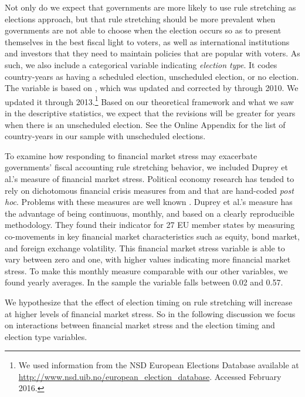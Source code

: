 \documentclass[]{article}
\begin{document}
Not only do we expect that governments are more likely to use rule stretching as elections approach, but that rule stretching should be more prevalent when governments are not able to choose when the election occurs so as to present themselves in the best fiscal light to voters, as well as international institutions and investors that they need to maintain policies that are popular with voters. As such, we also include a categorical variable indicating \emph{election type}. It codes country-years as having a scheduled election, unscheduled election, or no election. The variable is based on \cite{Brender2008}, which was updated and corrected by \cite{hallerbergWehner2015} through 2010. We updated it through 2013.\footnote{We used information from the NSD European Elections Database available at \url{http://www.nsd.uib.no/european_election_database}. Accessed February 2016.} Based on our theoretical framework and what we saw in the descriptive statistics, we expect that the revisions will be greater for years when there is an unscheduled election. See the Online Appendix for the list of country-years in our sample with unscheduled elections.

To examine how responding to financial market stress may exacerbate governments' fiscal accounting rule stretching behavior, we included Duprey et al.'s \citeyearpar{ThibautDuprey2015} measure of financial market stress. Political economy research has tended to rely on dichotomous financial crisis measures from \cite{Laeven2012} and \cite{ReinhartRog2010} that are hand-coded \emph{post hoc}. Problems with these measures are well known \citep[see][]{finstress_paper}. Duprey et al.'s measure has the advantage of being continuous, monthly, and based on a clearly reproducible methodology. They found their indicator for 27 EU member states by measuring co-movements in key financial market characteristics such as equity, bond market, and foreign exchange volatility. This financial market stress variable is able to vary between zero and one, with higher values indicating more financial market stress. To make this monthly measure comparable with our other variables, we found yearly averages. In the sample the variable falls between 0.02 and 0.57.

We hypothesize that the effect of election timing on rule stretching will increase at higher levels of financial market stress. So in the following discussion we focus on interactions between financial market stress and the election timing and election type variables.
\end{document}
